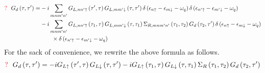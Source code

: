 \documentclass[11pt,a4paper]{article}
\begin{document}
\begin{equation}
\begin{split}
{\color{red}{\Large{?}}}~~G_{d}\left(\tau, \tau^{\prime}\right)=&-i \sum_{mnm'n'}G_{L,nn' \uparrow}\left(\tau^{\prime}, \tau\right) G_{L,mm' \downarrow}\left(\tau, \tau^{\prime}\right)\delta\left(\epsilon_{n \uparrow}-\epsilon_{m \downarrow}-\omega_{q}\right) \delta\left(\epsilon_{n' \uparrow}-\epsilon_{m' \downarrow}-\omega_{q}\right)\\
&-i \sum_{mnm'n'}G_{L,nn' \uparrow}\left(\tau_{1}, \tau\right) G_{L,mm' \downarrow}\left(\tau, \tau_{1}\right) \Sigma_{R,mnm'n'}\left(\tau_{1}, \tau_{2}\right) G_{d}\left(\tau_{2}, \tau^{\prime}\right) \delta\left(\epsilon_{n \uparrow}-\epsilon_{m \downarrow}-\omega_{q}\right)\\
&\qquad\times \delta\left(\epsilon_{n' \uparrow}-\epsilon_{m' \downarrow}-\omega_{q}\right)
\label{eq:1}
\end{split}
\end{equation}
For the sack of convenience, we rewrite the above formula as follows.
\begin{equation}
{\color{red}{\Large{?}}}~~G_{d}\left(\tau, \tau^{\prime}\right)=-i G_{L \uparrow}\left(\tau^{\prime}, \tau\right) G_{L \downarrow}\left(\tau, \tau^{\prime}\right)-i G_{L \uparrow}\left(\tau_{1}, \tau\right) G_{L \downarrow}\left(\tau, \tau_{1}\right) \Sigma_{R }\left(\tau_{1}, \tau_{2}\right) G_{d}\left(\tau_{2}, \tau^{\prime}\right)
\label{eq:1}
\end{equation}
\end{document}
